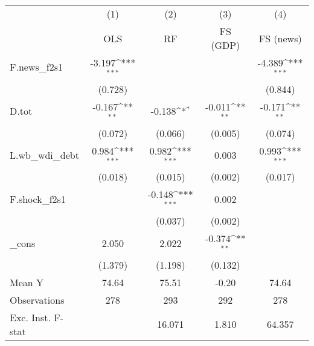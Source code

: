 {
\def\sym#1{\ifmmode^{#1}\else\(^{#1}\)\fi}
\begin{tabular}{l*{4}{c}}
\toprule
            &\multicolumn{1}{c}{(1)}&\multicolumn{1}{c}{(2)}&\multicolumn{1}{c}{(3)}&\multicolumn{1}{c}{(4)}\\
            &\multicolumn{1}{c}{OLS}&\multicolumn{1}{c}{RF}&\multicolumn{1}{c}{FS (GDP)}&\multicolumn{1}{c}{FS (news)}\\
\midrule
F.news\_f2s1 &      -3.197\sym{***}&                     &                     &      -4.389\sym{***}\\
            &     (0.728)         &                     &                     &     (0.844)         \\
\addlinespace
D.tot       &      -0.167\sym{**} &      -0.138\sym{*}  &      -0.011\sym{**} &      -0.171\sym{**} \\
            &     (0.072)         &     (0.066)         &     (0.005)         &     (0.074)         \\
\addlinespace
L.wb\_wdi\_debt&       0.984\sym{***}&       0.982\sym{***}&       0.003         &       0.993\sym{***}\\
            &     (0.018)         &     (0.015)         &     (0.002)         &     (0.017)         \\
\addlinespace
F.shock\_f2s1&                     &      -0.148\sym{***}&       0.002         &                     \\
            &                     &     (0.037)         &     (0.002)         &                     \\
\addlinespace
\_cons      &       2.050         &       2.022         &      -0.374\sym{**} &                     \\
            &     (1.379)         &     (1.198)         &     (0.132)         &                     \\
\midrule
Mean Y      &       74.64         &       75.51         &       -0.20         &       74.64         \\
Observations&         278         &         293         &         292         &         278         \\
Exc. Inst. F-stat&                     &      16.071         &       1.810         &      64.357         \\
\bottomrule
\end{tabular}
}
